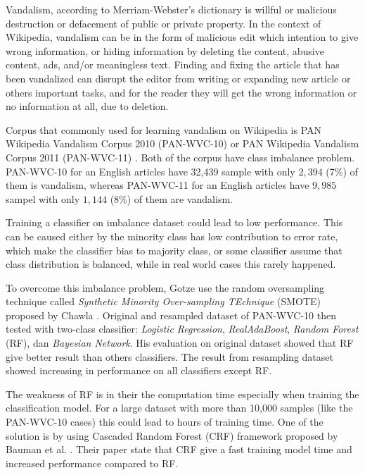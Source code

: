 \documentclass[conference,compsoc,a4paper,twocolumn,final]{IEEEtran}
\begin{document}
Vandalism, according to Merriam-Webster's dictionary is willful or malicious
destruction or defacement of public or private property.
In the context of Wikipedia, vandalism can be in the form of malicious edit
which intention to give wrong information, or hiding information by deleting
the content, abusive content, ads, and/or meaningless text.
Finding and fixing the article that has been vandalized can disrupt the editor
from writing or expanding new article or others important tasks, and for the
reader they will get the wrong information or no information at all, due to
deletion.

Corpus that commonly used for learning vandalism on Wikipedia is PAN Wikipedia
Vandalism Corpus 2010 (PAN-WVC-10)
\cite{potthast:2010b}
or PAN Wikipedia Vandalism Corpus 2011 (PAN-WVC-11)
\cite{potthast:2010b}.
Both of the corpus have class imbalance problem.
PAN-WVC-10 for an English articles have 32,439 sample with only $2,394$ (7\%)
of them is vandalism, whereas PAN-WVC-11 for an English articles have $9,985$
sampel with only $1,144$ (8\%) of them are vandalism.

Training a classifier on imbalance dataset could lead to low performance.
This can be caused either by the minority class has low contribution to error
rate, which make the classifier bias to majority class, or some classifier
assume that class distribution is balanced, while in real world cases this
rarely happened.

To overcome this imbalance problem, Gotze
\cite{gotze2014advanced}
use the random oversampling technique called
\textit{Synthetic Minority Over-sampling TEchnique} (SMOTE)
proposed by Chawla
\cite{chawla2002smote}.
Original and resampled dataset of PAN-WVC-10 then tested with two-class
classifier:
\textit{Logistic Regression},
\textit{RealAdaBoost},
\textit{Random Forest} (RF), dan
\textit{Bayesian Network}.
His evaluation on original dataset showed that RF give better result than
others classifiers.
The result from resampling dataset showed increasing in performance on all
classifiers except RF.

The weakness of RF is in their the computation time especially when training
the classification model.
For a large dataset with more than 10,000 samples (like the PAN-WVC-10 cases)
this could lead to hours of training time.
One of the solution is by using Cascaded Random Forest (CRF) framework proposed
by Bauman et al.
\cite{baumann2013cascaded}.
Their paper state that CRF give a fast training model time and increased
performance compared to RF.
\end{document}
